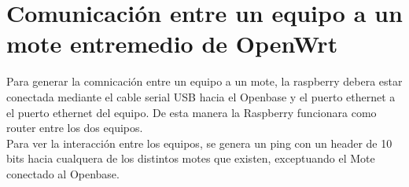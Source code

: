 \documentclass[journal]{IEEEtran}
\begin{document}
\section{Comunicación entre un equipo a un mote entremedio de OpenWrt}
Para generar la comnicación entre un equipo a un mote, la raspberry debera estar conectada mediante el cable serial USB hacia el Openbase y el puerto ethernet a el puerto ethernet del equipo. De esta manera la Raspberry funcionara como router entre los dos equipos.
\\

Para ver la interacción entre los equipos, se genera un ping con un header de 10 bits hacia cualquera de los distintos motes que existen, exceptuando el Mote conectado al Openbase.   
\end{document}
